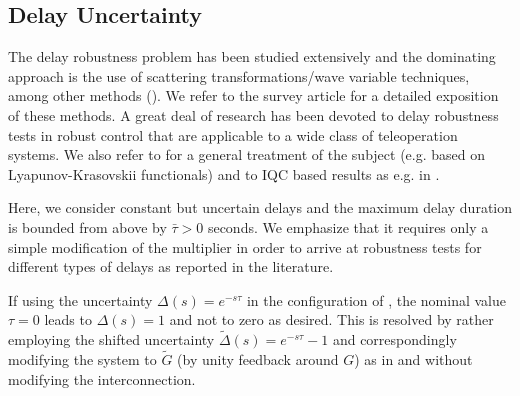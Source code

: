 \subsection{Delay Uncertainty}\label{sec:delayiqc}

The delay robustness problem has been studied extensively and the dominating approach is the use of scattering transformations/wave variable techniques, among other methods (\cite{leungfa, eusebi, andersonspong, nieslotine, nieslotine2, hokayemspong, yokokohji, lozano, arcara, parkcho, aziminejad, leespong}). We refer to the survey article \cite{hokayemspong} for a detailed exposition of these methods. A great deal of research has been devoted to delay robustness tests in robust control that are applicable to a wide class of teleoperation systems. We also refer to \cite{richard} for a general treatment of the subject (e.g. based on Lyapunov-Krasovskii functionals) and to IQC based results as e.g. in \cite{scorletti,junsafonov,kaorantzer,niculescu}.

Here, we consider constant but uncertain delays and the maximum delay duration is bounded from above by $\bar{\tau} > 0$ seconds. We emphasize that it requires only a
simple modification of the multiplier in order to arrive at robustness tests for different types of delays as reported in the literature.


If using the uncertainty $\Delta(s)=e^{-s\tau}$ in the configuration of
, the nominal value $\tau=0$ leads to $\Delta(s)=1$ and not to zero as desired. This is resolved by rather employing the shifted uncertainty
$\tilde{\Delta}(s)=e^{-s\tau}-1$ and correspondingly modifying the system
to $\tilde{G}$ (by unity feedback around $G$) as in  and without modifying the interconnection.


